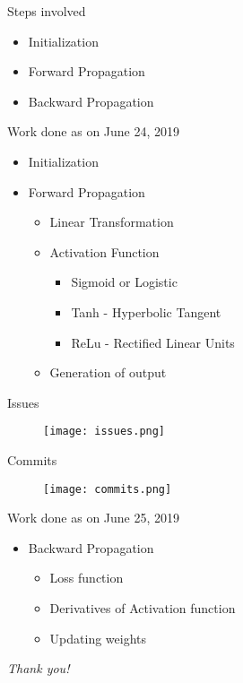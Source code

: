 \documentclass{beamer}
\begin{document}
\begin{frame}{Steps involved}
    \begin{itemize}
        \item Initialization
        \item Forward Propagation
        \item Backward Propagation
    \end{itemize}
\end{frame}
    
\begin{frame}{Work done as on June 24, 2019}
    \begin{itemize}
        \item Initialization
        \item Forward Propagation
        \pause
            \begin{itemize}
                \item Linear Transformation
                \pause
                \item Activation Function
                \pause
                    \begin{itemize}
                        \item Sigmoid or Logistic
                        \item Tanh - Hyperbolic Tangent
                        \item ReLu - Rectified Linear Units
                    \end{itemize}
                \pause
                \item Generation of output
            \end{itemize}
    \end{itemize}
\end{frame}

\begin{frame}{Issues}
    \begin{figure}
        \centering
        \texttt{[image: issues.png]}
    \end{figure}
\end{frame}
    
\begin{frame}{Commits}
    \begin{figure}
        \centering
        \texttt{[image: commits.png]}
    \end{figure}
\end{frame}

\begin{frame}{Work done as on June 25, 2019}
    \begin{itemize}
        \item Backward Propagation
        \pause
        \begin{itemize}
            \item Loss function
            \item Derivatives of Activation function
            \item Updating weights
         \end{itemize}
    \end{itemize}
\end{frame}
        
\begin{frame}{}
  \centering \Large
  \color{blue}
  \emph{Thank you!}
\end{frame}
\end{document}
